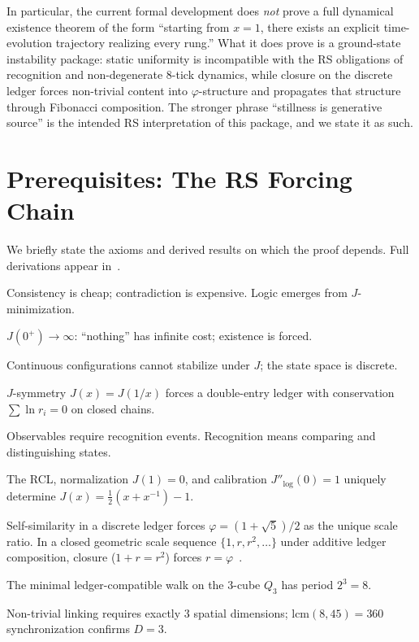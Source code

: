 \documentclass[11pt,a4paper]{article}
\newcommand{\Jcost}{J}
\newcommand{\phirs}{\varphi}
\begin{document}
In particular, the current formal development does \emph{not} prove a full dynamical existence theorem of the form ``starting from $x=1$, there exists an explicit time-evolution trajectory realizing every rung.''  What it does prove is a ground-state instability package: static uniformity is incompatible with the RS obligations of recognition and non-degenerate 8-tick dynamics, while closure on the discrete ledger forces non-trivial content into $\phirs$-structure and propagates that structure through Fibonacci composition.  The stronger phrase ``stillness is generative source'' is the intended RS interpretation of this package, and we state it as such.

\section{Prerequisites: The RS Forcing Chain}
\label{sec:prereqs}

We briefly state the axioms and derived results on which the proof depends.  Full derivations appear in~\cite{RS-Published,RS-Axioms}.

\begin{description}[leftmargin=2em,style=nextline]
\item[T0 (Logic from Cost)] Consistency is cheap; contradiction is expensive.  Logic emerges from $\Jcost$-minimization.
\item[T1 (Meta-Principle, derived)] $\Jcost(0^+)\to\infty$: ``nothing'' has infinite cost; existence is forced.
\item[T2 (Discreteness)] Continuous configurations cannot stabilize under $\Jcost$; the state space is discrete.
\item[T3 (Ledger)] $\Jcost$-symmetry $\Jcost(x)=\Jcost(1/x)$ forces a double-entry ledger with conservation $\sum\ln r_i=0$ on closed chains.
\item[T4 (Recognition)] Observables require recognition events.  Recognition means comparing and distinguishing states.
\item[T5 (Cost Uniqueness)] The RCL, normalization $\Jcost(1)=0$, and calibration $\Jcost''_{\log}(0)=1$ uniquely determine $\Jcost(x)=\frac12(x+x^{-1})-1$.
\item[T6 ($\phirs$ Forced)] Self-similarity in a discrete ledger forces $\phirs=(1+\sqrt5)/2$ as the unique scale ratio.  In a closed geometric scale sequence $\{1,r,r^2,\ldots\}$ under additive ledger composition, closure ($1+r=r^2$) forces $r=\phirs$~\cite{RS-PhiForcingDerived}.
\item[T7 (8-Tick)] The minimal ledger-compatible walk on the 3-cube $Q_3$ has period $2^3=8$.
\item[T8 ($D=3$)] Non-trivial linking requires exactly 3 spatial dimensions; $\text{lcm}(8,45)=360$ synchronization confirms $D=3$.
\end{description}
\end{document}

